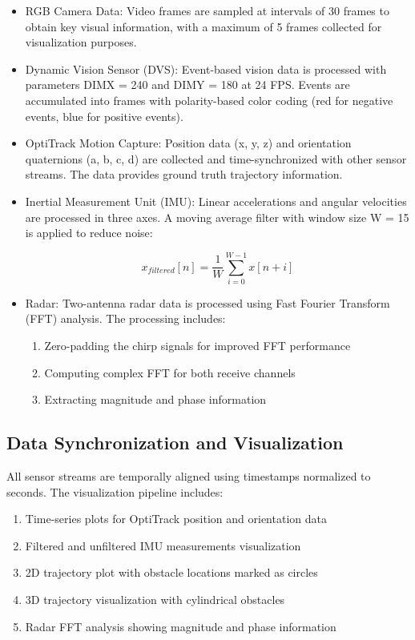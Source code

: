 \documentclass[12pt,a4paper]{article}
\begin{document}
\begin{itemize}
    \item RGB Camera Data: Video frames are sampled at intervals of 30 frames to obtain key visual information, with a maximum of 5 frames collected for visualization purposes.
    
    \item Dynamic Vision Sensor (DVS): Event-based vision data is processed with parameters DIMX = 240 and DIMY = 180 at 24 FPS. Events are accumulated into frames with polarity-based color coding (red for negative events, blue for positive events).
    
    \item OptiTrack Motion Capture: Position data (x, y, z) and orientation quaternions (a, b, c, d) are collected and time-synchronized with other sensor streams. The data provides ground truth trajectory information.
    
    \item Inertial Measurement Unit (IMU): Linear accelerations and angular velocities are processed in three axes. A moving average filter with window size W = 15 is applied to reduce noise:
    
    \begin{equation}
        x_{filtered}[n] = \frac{1}{W}\sum_{i=0}^{W-1} x[n+i]
    \end{equation}
    
    \item Radar: Two-antenna radar data is processed using Fast Fourier Transform (FFT) analysis. The processing includes:
    \begin{enumerate}
        \item Zero-padding the chirp signals for improved FFT performance
        \item Computing complex FFT for both receive channels
        \item Extracting magnitude and phase information
    \end{enumerate}
\end{itemize}

\subsection{Data Synchronization and Visualization}

All sensor streams are temporally aligned using timestamps normalized to seconds. The visualization pipeline includes:

\begin{enumerate}
    \item Time-series plots for OptiTrack position and orientation data
    \item Filtered and unfiltered IMU measurements visualization
    \item 2D trajectory plot with obstacle locations marked as circles
    \item 3D trajectory visualization with cylindrical obstacles
    \item Radar FFT analysis showing magnitude and phase information
\end{enumerate}
\end{document}
